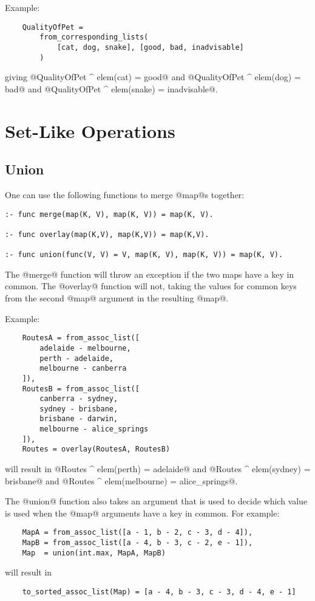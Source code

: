 Example:
\begin{verbatim}
    QualityOfPet =
        from_corresponding_lists(
            [cat, dog, snake], [good, bad, inadvisable]
        )
\end{verbatim}
giving @QualityOfPet ^ elem(cat) = good@ and
@QualityOfPet ^ elem(dog) = bad@ and
@QualityOfPet ^ elem(snake) = inadvisable@.

\section{Set-Like Operations}

\subsection{Union}

One can use the following functions to merge @map@s together:
\begin{verbatim}
:- func merge(map(K, V), map(K, V)) = map(K, V).

:- func overlay(map(K,V), map(K,V)) = map(K,V).

:- func union(func(V, V) = V, map(K, V), map(K, V)) = map(K, V).
\end{verbatim}
The @merge@ function will throw an exception if the two maps have a key
in common.  The @overlay@ function will not, taking the values for
common keys from the second @map@ argument in the resulting @map@.

Example:
\begin{verbatim}
    RoutesA = from_assoc_list([
        adelaide - melbourne,
        perth - adelaide,
        melbourne - canberra
    ]),
    RoutesB = from_assoc_list([
        canberra - sydney,
        sydney - brisbane,
        brisbane - darwin,
        melbourne - alice_springs
    ]),
    Routes = overlay(RoutesA, RoutesB)
\end{verbatim}
will result in @Routes ^ elem(perth) = adelaide@ and
@Routes ^ elem(sydney) = brisbane@ and
@Routes ^ elem(melbourne) = alice_springs@.

The @union@ function also takes an argument that is used to decide which
value is used when the @map@ arguments have a key in common.  For
example:
\begin{verbatim}
    MapA = from_assoc_list([a - 1, b - 2, c - 3, d - 4]),
    MapB = from_assoc_list([a - 4, b - 3, c - 2, e - 1]),
    Map  = union(int.max, MapA, MapB)
\end{verbatim}
will result in
\begin{verbatim}
    to_sorted_assoc_list(Map) = [a - 4, b - 3, c - 3, d - 4, e - 1]
\end{verbatim}

